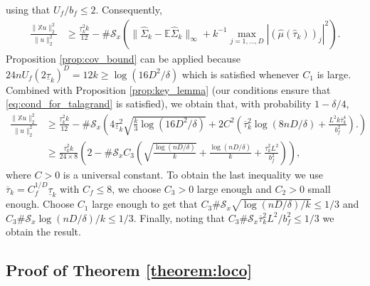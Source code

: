 using that $U_f/b_f \leq 2$. Consequently,
\begin{align*}
\frac{  \| \mathbb X u\|_2^2 }{\|u\|_2^2}  &\geq \frac { \underline \tau_k  ^{2 } k  }{12 }     -     \#\mathcal S_x \left( \| \hat \Sigma_k - \mathbb E \hat \Sigma_k\|_\infty    + k^{-1} \max_{j=1,\ldots, D}  | (\hat \mu( \hat \tau_ k ))_j |^2\right).
  \end{align*}
Proposition \ref{prop:cov_bound} can be applied because $24 nU_f  (2\underline \tau_k ) ^{D} = 12k  \geq   \log(16D^2 /\delta ) $ which is satisfied whenever $C_1$ is large. Combined with Proposition \ref{prop:key_lemma} (our conditions ensure that \eqref{eq:cond_for_talagrand} is satisfied), we obtain that, with probability $1-\delta/4$,
\begin{align*}
\frac{\|\mathbb X u \|_2^2 }{\|u\|_2^2}  & \geq \frac { \underline \tau_k  ^{2 } k  }{12 }   -  \#\mathcal S_x \left( 4 \underline \tau_k^2  \sqrt {  \frac{  k }{3}   \log(16 D^2/\delta)  }+
2C ^2   \left( \overline \tau_k^2    \log(  8 n D  /  \delta )    +  \frac { L^2 k \overline\tau_k   ^{4}}{ b_f^2  }   \right).
 \right)\\
&\geq   \frac { \overline \tau_k  ^{2 } k   }{24 \times 8  } \left( 2    - \#\mathcal S_x C _ 3 \left(    \sqrt {  \frac{   \log(nD/\delta)   }{k}  }+
\frac{   \log(  n  D  /  \delta )} {k}   +  \frac {      \overline\tau_k   ^{2} L ^2}{ b_f^2  }
 \right) \right )    ,
\end{align*}
where $C>0$ is a universal constant. To obtain the last inequality we use $ \overline \tau_k = C_f ^{1/D} \underline \tau_k$ with $C_f\leq 8$,  we choose $C _ 3  >0 $ large enough and $C_2>0 $ small enough. Choose $C_1 $ large enough to get that $ C _ 3  \#\mathcal S_x \sqrt{  \log( n D  /  \delta ) / k }  \leq 1  / 3 $ and $ C _ 3  \# \mathcal S_x   \log(  n  D  /  \delta ) / k   \leq  1 / 3 $. Finally, noting that
 $  C _ 3  \# \mathcal S_x      \overline\tau_k   ^{2} L ^2  / b_f^2   \leq  1  /3$ we obtain the result.




 \subsection*{Proof of Theorem \ref{theorem:loco}}

